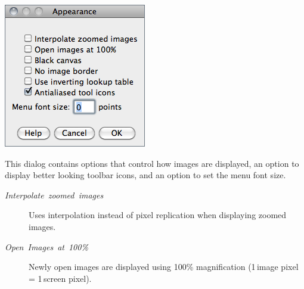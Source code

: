 \begin{minipage}[c][1\totalheight][t]{0.343\columnwidth}%
\includegraphics[scale=0.55]{images/Appearance}%
\end{minipage}%
\begin{minipage}[c][1\totalheight][t]{0.657\columnwidth}%
This dialog contains options that control how images are displayed,
an option to display better looking toolbar icons, and an option to
set the menu font size.
\begin{description}
\item [{\emph{Interpolate\ zoomed\ images}}] Uses interpolation instead
of pixel replication when displaying zoomed images.
\item [{\emph{Open}\ \emph{Images}\ \emph{at}\ \emph{100\%}}] Newly
open images are displayed using 100\% magnification (1\,image pixel
= 1\,screen pixel).\end{description}
%
\end{minipage}

